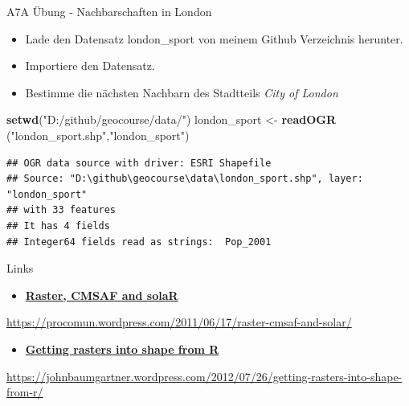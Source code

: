 \documentclass[ignorenonframetext,]{beamer}
\newenvironment{Shaded}{\begin{snugshade}}{\end{snugshade}}
\newcommand{\KeywordTok}[1]{\textcolor[rgb]{0.13,0.29,0.53}{\textbf{#1}}}
\newcommand{\NormalTok}[1]{#1}
\newcommand{\StringTok}[1]{\textcolor[rgb]{0.31,0.60,0.02}{#1}}
\providecommand{\tightlist}{%
  \setlength{\itemsep}{0pt}\setlength{\parskip}{0pt}}
\begin{document}
\begin{frame}[fragile]{A7A Übung - Nachbarschaften in London}
\protect\hypertarget{a7a-ubung---nachbarschaften-in-london}{}

\begin{itemize}
\tightlist
\item
  Lade den Datensatz london\_sport von meinem Github Verzeichnis
  herunter.
\item
  Importiere den Datensatz.
\item
  Bestimme die nächsten Nachbarn des Stadtteils \emph{City of London}
\end{itemize}

\begin{Shaded}
\begin{Highlighting}[]
\KeywordTok{setwd}\NormalTok{(}\StringTok{"D:/github/geocourse/data/"}\NormalTok{)}
\NormalTok{london_sport <-}\StringTok{ }\KeywordTok{readOGR}\NormalTok{ (}\StringTok{"london_sport.shp"}\NormalTok{,}\StringTok{"london_sport"}\NormalTok{)}
\end{Highlighting}
\end{Shaded}

\begin{verbatim}
## OGR data source with driver: ESRI Shapefile 
## Source: "D:\github\geocourse\data\london_sport.shp", layer: "london_sport"
## with 33 features
## It has 4 fields
## Integer64 fields read as strings:  Pop_2001
\end{verbatim}

\end{frame}

\begin{frame}{Links}
\protect\hypertarget{links}{}

\begin{itemize}
\tightlist
\item
  \href{https://procomun.wordpress.com/2011/06/17/raster-cmsaf-and-solar/}{\textbf{Raster,
  CMSAF and solaR}}
\end{itemize}

\url{https://procomun.wordpress.com/2011/06/17/raster-cmsaf-and-solar/}

\begin{itemize}
\tightlist
\item
  \href{https://johnbaumgartner.wordpress.com/2012/07/26/getting-rasters-into-shape-from-r/}{\textbf{Getting
  rasters into shape from R}}
\end{itemize}

\url{https://johnbaumgartner.wordpress.com/2012/07/26/getting-rasters-into-shape-from-r/}

\end{frame}
\end{document}
